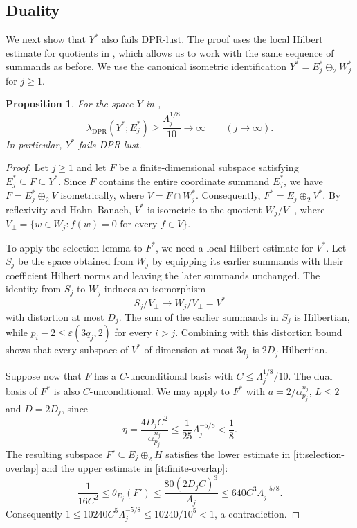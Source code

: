 \documentclass[11pt,a4paper,reqno]{amsart}
\newtheorem{proposition}[proposition]{Proposition}
\theoremstyle{definition}
\numberwithin{equation}{section}
\begin{document}
\subsection{Duality}

We next show that $Y^*$ also fails DPR-lust. The proof uses the local Hilbert estimate for quotients in , which allows us to work with the same sequence of summands as before. We use the canonical isometric identification $Y^*=E_j^*\oplus_2W_j^*$ for $j\geq1$.

\begin{proposition}\label{prop:dual-obstruction}
For the space $Y$ in ,
\begin{equation*}
 \lambda_{\mathrm{DPR}}(Y^*;E_j^*)
 \geq\frac{\Lambda_j^{1/8}}{10}
 \longrightarrow\infty\qquad(j\to\infty).
\end{equation*}
In particular, $Y^*$ fails DPR-lust.
\end{proposition}

\begin{proof}
Let $j\geq1$ and let $F$ be a finite-dimensional subspace satisfying $E_j^*\subseteq F\subseteq Y^*$. Since $F$ contains the entire coordinate summand $E_j^*$, we have $F=E_j^*\oplus_2V$ isometrically, where $V=F\cap W_j^*$. Consequently, $F^*=E_j\oplus_2V^*$. By reflexivity and Hahn--Banach, $V^*$ is isometric to the quotient $W_j/V_\perp$, where $V_\perp=\{w\in W_j:f(w)=0\text{ for every }f\in V\}$.

To apply the selection lemma to $F^*$, we need a local Hilbert estimate for $V^*$. Let $S_j$ be the space obtained from $W_j$ by equipping its earlier summands with their coefficient Hilbert norms and leaving the later summands unchanged. The identity from $S_j$ to $W_j$ induces an isomorphism
\begin{equation*}
 S_j/V_\perp\longrightarrow W_j/V_\perp=V^*
\end{equation*}
with distortion at most $D_j$. The sum of the earlier summands in $S_j$ is Hilbertian, while $p_i-2\leq\varepsilon(3q_j,2)$ for every $i>j$. Combining  with this distortion bound shows that every subspace of $V^*$ of dimension at most $3q_j$ is $2D_j$-Hilbertian.

Suppose now that $F$ has a $C$-unconditional basis with $C\leq\Lambda_j^{1/8}/10$. The dual basis of $F^*$ is also $C$-unconditional. We may apply  to $F^*$ with $a=2/\alpha_{p_j}^{n_j}$, $L\leq2$ and $D=2D_j$, since
\begin{equation*}
 \eta=\frac{4D_jC^2}{\alpha_{p_j}^{n_j}}
 \leq\frac1{25}\Lambda_j^{-5/8}<\frac18.
\end{equation*}
The resulting subspace $F'\subseteq E_j\oplus_2H$ satisfies the lower estimate in \ref{it:selection-overlap} and the upper estimate in \ref{it:finite-overlap}:
\begin{equation*}
 \frac1{16C^2}\leq\theta_{E_j}(F')
 \leq\frac{80(2D_jC)^3}{\Lambda_j}
 \leq640C^3\Lambda_j^{-5/8}.
\end{equation*}
Consequently $1\leq10240C^5\Lambda_j^{-5/8} \leq10240/10^5<1$, a contradiction.
\end{proof}
\end{document}
